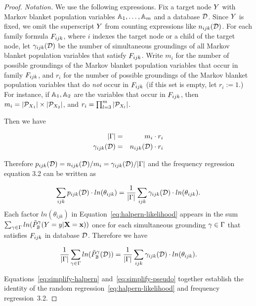 \documentclass[twoside,leqno,twocolumn]{article}
\begin{document}
\begin{proof} {\em Notation.} We use the following expressions. Fix a target node $Y$ with Markov blanket population variables $\mathbb{A}_{1},\ldots,\mathbb{A}_{m}$ and a database $\mathcal{D}$. Since $Y$ is fixed, we omit the superscript $Y$ from counting expressions like $n_{ijk}(\mathcal{D})$.
For each family formula $F_{ijk}$, where $i$ indexes the target node or a child of the target node, let $\gamma_{ijk}(\mathcal{D})$ be the number of simultaneous groundings of all Markov blanket population variables that satisfy $F_{ijk}$. Write $m_{i}$ for the number of possible groundings of the Markov blanket population variables that occur in family $F_{ijk}$, and
 $r_{i}$ for the number of possible groundings of the Markov blanket population variables that  do {\em not} occur in $F_{ijk}$ (if this set is empty, let $r_{i}:=1$.) For instance, if  $\mathbb{A}_{1},\mathbb{A}_{2}$ are the variables that occur in $F_{ijk}$, then $m_{i} = |\mathcal{P}_{X_{1}}| \times |\mathcal{P}_{X_{2}}|$, and $r_{i} = \prod_{l=3}^{m}|\mathcal{P}_{X_{l}}|$.

Then we have

\begin{eqnarray*}
|\Gamma| & = & m_{i} \cdot r_{i}\\
\gamma_{ijk}(\mathcal{D}) & = & n_{ijk}(\mathcal{D}) \cdot r_{i}
\end{eqnarray*}

Therefore $p_{ijk}(\mathcal{D}) = n_{ijk}(\mathcal{D})/m_{i}=\gamma_{ijk}(\mathcal{D})/|\Gamma|$ and the frequency regression equation 3.2 can be written as

\begin{equation} \label{eq:simplify-pseudo}
 \sum_{ijk} p_{ijk}(\mathcal{D}) \cdot ln(\theta_{ijk}) = \frac{1}{|\Gamma|} \sum_{ijk} \gamma_{ijk}(\mathcal{D}) \cdot ln(\theta_{ijk}).
\end{equation}
Each factor $ln(\theta_{ijk})$ in Equation~\eqref{eq:halpern-likelihood} appears in the sum $\sum_{\gamma \in \Gamma}  ln(\tilde{P}_{\mathbb{B}}^{\gamma}(Y = y|\mathbf{X}=\mathbf{x}))$ once for each simultaneous grounding $\gamma \in \Gamma$ that satisfies $F_{ijk}$ in database $\mathcal{D}$. Therefore we have

\begin{equation} \label{eq:simplify-halpern}
\frac{1}{|\Gamma|} \sum_{\gamma \in \Gamma} ln(\tilde{P}_{\mathbb{B}}^{\gamma}(\mathcal{D}))= \frac{1}{|\Gamma|} \sum_{ijk} \gamma_{ijk}(\mathcal{D}) \cdot ln(\theta_{ijk}).
\end{equation}

Equations~\eqref{eq:simplify-halpern} and~\eqref{eq:simplify-pseudo} together establish the identity of the random regression~\eqref{eq:halpern-likelihood} and frequency regression~3.2.
\end{proof}
\end{document}
